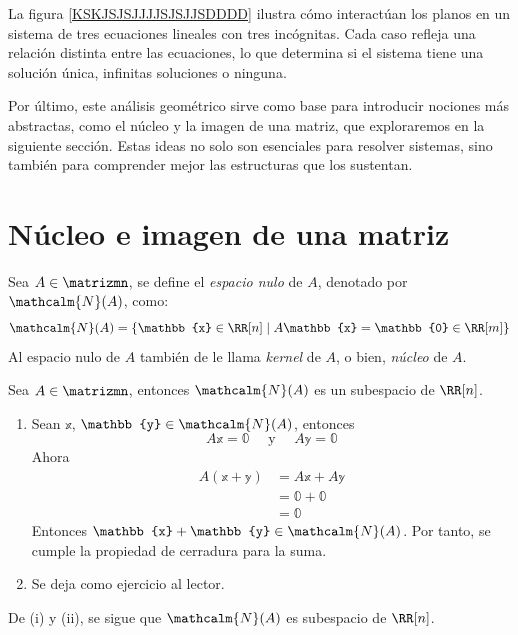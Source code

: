 La figura \ref{KSKJSJSJJJJSJSJJSDDDD} ilustra cómo interactúan los planos en un sistema de tres ecuaciones lineales con tres incógnitas. Cada caso refleja una relación distinta entre las ecuaciones, lo que determina si el sistema tiene una solución única, infinitas soluciones o ninguna.

Por último, este análisis geométrico sirve como base para introducir nociones más abstractas, como el núcleo y la imagen de una matriz, que exploraremos en la siguiente sección. Estas ideas no solo son esenciales para resolver sistemas, sino también para comprender mejor las estructuras que los sustentan.

\section{Núcleo e imagen de una matriz}

\begin{definicion}{}{}
    Sea $A \in \matrizmn$, se define el \emph{espacio nulo} de $A$, denotado por $\mathcalm{N}(A)$, como:
    $$\mathcalm{N}(A) = \left\{ \mathbb{x} \in \RR[n] \mid A\mathbb{x} = \mathbb{0} \in \RR[m] \right\}$$
    Al espacio nulo de $A$ también de le llama \emph{kernel} de $A$, o bien, \emph{núcleo} de $A$.
\end{definicion}

\begin{theorem}{}{}
    Sea $A \in \matrizmn$, entonces $\mathcalm{N}(A)$ es un subespacio de $\RR[n]$.

    \tcblower
    \demostracion
    \begin{enumerate}[label=\roman*), topsep=6pt, itemsep=0pt]
        \item Sean $\mathbb{x}$, $\mathbb{y} \in \mathcalm{N}(A)$, entonces
        \begin{equation*}
            A\mathbb{x} = \mathbb{0} \quad \text{ y } \quad A\mathbb{y} = \mathbb{0} \label{ec30}
        \end{equation*}
        Ahora
        \begin{align*}
            A(\mathbb{x} + \mathbb{y}) & = A \mathbb{x} + A \mathbb{y} \\
            & = \mathbb{0} + \mathbb{0} \\
            & = \mathbb{0}
        \end{align*}
        Entonces $\mathbb{x} + \mathbb{y} \in \mathcalm{N}(A)$. Por tanto, se cumple la propiedad de cerradura para la suma.
        \item Se deja como ejercicio al lector.
    \end{enumerate}
    De (i) y (ii), se sigue que $\mathcalm{N}(A)$ es subespacio de $\RR[n]$.
\end{theorem}

